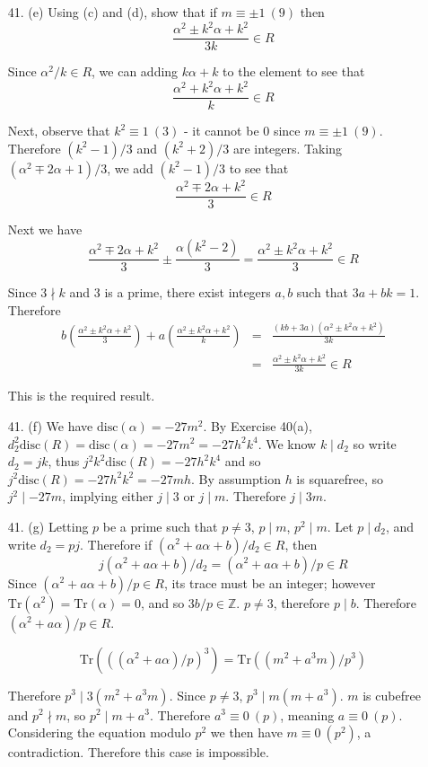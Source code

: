 \documentclass{article}
\newcommand{\Z}[0]{\mathbb{Z}}
\newcommand{\trace}[1]{\text{Tr}(#1)}
\newcommand{\disc}[1]{\text{disc}(#1)}
\newcommand{\modequiv}[3]{#1 \equiv #2\ (#3)}
\begin{document}
\begin{enumerate}
\item[41. (e)] Using (c) and (d), show that if $m \equiv \pm 1\ (9)$ then
\[ \frac{\alpha^2 \pm k^2 \alpha + k^2}{3k} \in R \]

Since $\alpha^2 / k \in R$, we can adding $k\alpha + k$ to the element to see that \[ \frac{\alpha^2 + k^2\alpha + k^2}{k} \in R \]

Next, observe that $\modequiv{k^2}{1}{3}$ - it cannot be 0 since $\modequiv{m}{\pm 1}{9}$.  Therefore $(k^2 - 1)/3$ and $(k^2 + 2)/3$ are integers.  Taking $(\alpha^2 \mp 2\alpha + 1)/3$, we add $(k^2 - 1)/3$ to see that \[ \frac{\alpha^2 \mp 2\alpha + k^2}{3} \in R \]

Next we have
\[ \frac{\alpha^2 \mp 2\alpha + k^2}{3} \pm \frac{\alpha(k^2 - 2)}{3} = \frac{\alpha^2 \pm k^2\alpha + k^2}{3} \in R \]

Since $3 \nmid k$ and 3 is a prime, there exist integers $a, b$ such that $3a + bk = 1$.  Therefore
\begin{eqnarray*}
    b\left(\frac{\alpha^2 \pm k^2\alpha + k^2}{3}\right) + a\left(\frac{\alpha^2 \pm k^2\alpha + k^2}{k}\right) &=& \frac{(kb + 3a)(\alpha^2 \pm k^2\alpha + k^2)}{3k} \\
    &=& \frac{\alpha^2 \pm k^2\alpha + k^2}{3k} \in R
\end{eqnarray*}

This is the required result.

\item[41. (f)]  We have $\disc{\alpha} = -27m^2$.  By Exercise 40(a), $d_2^2 \disc{R} = \disc{\alpha} = -27m^2 = -27h^2 k^4$.  We know $k \mid d_2$ so write $d_2 = jk$, thus $j^2 k^2 \disc{R} = -27h^2 k^4$ and so $j^2 \disc{R} = -27h^2 k^2 = -27mh$.  By assumption $h$ is squarefree, so $j^2 \mid -27m$, implying either $j \mid 3$ or $j \mid m$.  Therefore $j \mid 3m$.

\item[41. (g)]  Letting $p$ be a prime such that $p \neq 3$, $p \mid m$, $p^2 \mid m$.  Let $p \mid d_2$, and write $d_2 = pj$.  Therefore if $(\alpha^2 + a\alpha + b) / d_2 \in R$, then \[ j(\alpha^2 + a\alpha + b) / d_2 = (\alpha^2 + a\alpha + b) / p \in R \]  Since $(\alpha^2 + a\alpha + b)/p \in R$, its trace must be an integer; however $\trace{\alpha^2} =\trace{\alpha} = 0$, and so $3b / p \in \Z$.  $p \neq 3$, therefore $p \mid b$.  Therefore $(\alpha^2 + a\alpha) / p \in R$.

\[ \trace{((\alpha^2 + a\alpha)/p)^3} = \trace{(m^2 + a^3 m)/p^3} \]

Therefore $p^3 \mid 3(m^2 + a^3 m)$.  Since $p \neq 3$, $p^3 \mid m(m + a^3)$.  $m$ is cubefree and $p^2 \nmid m$, so $p^2 \mid m + a^3$.  Therefore $a^3 \equiv 0\ (p)$, meaning $a \equiv 0\ (p)$.  Considering the equation modulo $p^2$ we then have $m \equiv 0\ (p^2)$, a contradiction.  Therefore this case is impossible.


\end{enumerate}
\end{document}
